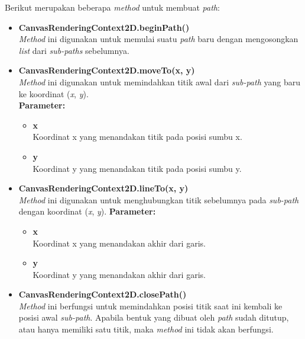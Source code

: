\documentclass[a4paper,twoside]{article}
\begin{document}
\begin{enumerate}
\begin{enumerate}
\begin{enumerate}
				Berikut merupakan beberapa \textit{method} untuk membuat \textit{path}:
				\begin{itemize}
					\item \textbf{CanvasRenderingContext2D.beginPath()} \\ 
					\textit{Method} ini digunakan untuk memulai suatu \textit{path} baru dengan mengosongkan \textit{list} dari \textit{sub-paths} sebelumnya.
					
					\item \textbf{CanvasRenderingContext2D.moveTo(x, y)} \\
					\textit{Method} ini digunakan untuk memindahkan titik awal dari \textit{sub-path} yang baru ke koordinat (\textit{x}, \textit{y}). \\
					\textbf{Parameter:}
					\begin{itemize}
						\item \textbf{x} \\ Koordinat x yang menandakan titik pada posisi sumbu x.
						\item \textbf{y} \\ Koordinat y yang menandakan titik pada posisi sumbu y.
					\end{itemize}
					
					\item \textbf{CanvasRenderingContext2D.lineTo(x, y)} \\
					\textit{Method} ini digunakan untuk menghubungkan titik sebelumnya pada \textit{sub-path} dengan koordinat (\textit{x}, \textit{y}).
					\textbf{Parameter:}
					\begin{itemize}
						\item \textbf{x} \\ Koordinat x yang menandakan akhir dari garis.
						\item \textbf{y} \\ Koordinat y yang menandakan akhir dari garis.
					\end{itemize}
					
					\item \textbf{CanvasRenderingContext2D.closePath()} \\
					\textit{Method} ini berfungsi untuk memindahkan posisi titik saat ini kembali ke posisi awal \textit{sub-path}. Apabila bentuk yang dibuat oleh \textit{path} sudah ditutup, atau hanya memiliki satu titik, maka \textit{method} ini tidak akan berfungsi.
					

\end{itemize}
\end{enumerate}
\end{enumerate}
\end{enumerate}
\end{document}
